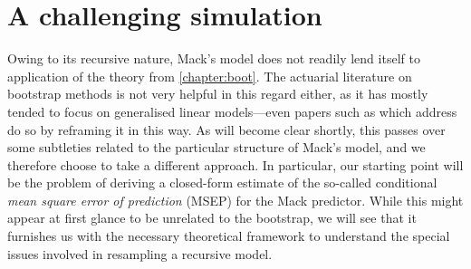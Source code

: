 \documentclass[a4paper]{book}
\begin{document}
\section{A challenging simulation} \label{sec:mack-challenge}

Owing to its recursive nature, Mack's model does not readily lend itself to application of the theory from \cref{chapter:boot}. The actuarial literature on bootstrap methods is not very helpful in this regard either, as it has mostly tended to focus on generalised linear models---even papers such as \cite{england:dist} which address  do so by reframing it in this way. As will become clear shortly, this passes over some subtleties related to the particular structure of Mack's model, and we therefore choose to take a different approach. In particular, our starting point will be the problem of deriving a closed-form estimate of the so-called conditional \emph{mean square error of prediction} (MSEP) for the Mack predictor. While this might appear at first glance to be unrelated to the bootstrap, we will see that it furnishes us with the necessary theoretical framework to understand the special issues involved in resampling a recursive model.
\end{document}
